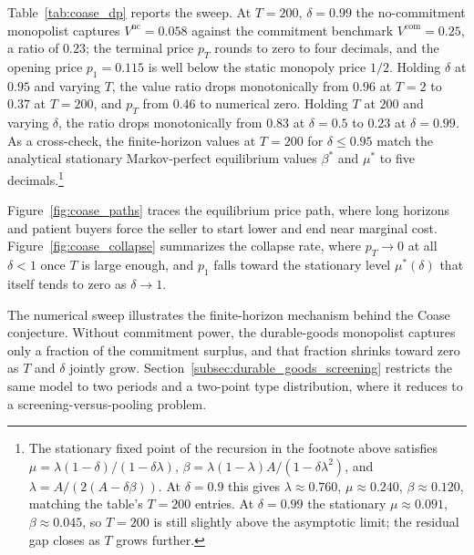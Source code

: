 \begin{table}[htbp]
\centering
\caption{Commitment value $V^{\mathrm{com}}$, no-commitment Markov-perfect value $V^{\mathrm{nc}}$, ratio $V^{\mathrm{nc}}/V^{\mathrm{com}}$, opening price $p_1$, and terminal price $p_T$ across the $(T, \delta)$ grid. Uniform valuations on $[0, 1]$, $c = 0$.}
\label{tab:coase_dp}

\end{table}

Table~\ref{tab:coase_dp} reports the sweep. At $T = 200$, $\delta = 0.99$ the no-commitment monopolist captures $V^{\mathrm{nc}} = 0.058$ against the commitment benchmark $V^{\mathrm{com}} = 0.25$, a ratio of $0.23$; the terminal price $p_T$ rounds to zero to four decimals, and the opening price $p_1 = 0.115$ is well below the static monopoly price $1/2$. Holding $\delta$ at $0.95$ and varying $T$, the value ratio drops monotonically from $0.96$ at $T = 2$ to $0.37$ at $T = 200$, and $p_T$ from $0.46$ to numerical zero. Holding $T$ at $200$ and varying $\delta$, the ratio drops monotonically from $0.83$ at $\delta = 0.5$ to $0.23$ at $\delta = 0.99$. As a cross-check, the finite-horizon values at $T = 200$ for $\delta \le 0.95$ match the analytical stationary Markov-perfect equilibrium values $\beta^*$ and $\mu^*$ to five decimals.\footnote{The stationary fixed point of the recursion in the footnote above satisfies $\mu = \lambda (1 - \delta) / (1 - \delta \lambda)$, $\beta = \lambda(1-\lambda) A / (1 - \delta \lambda^2)$, and $\lambda = A / (2 (A - \delta \beta))$. At $\delta = 0.9$ this gives $\lambda \approx 0.760$, $\mu \approx 0.240$, $\beta \approx 0.120$, matching the table's $T = 200$ entries. At $\delta = 0.99$ the stationary $\mu \approx 0.091$, $\beta \approx 0.045$, so $T = 200$ is still slightly above the asymptotic limit; the residual gap closes as $T$ grows further.}

Figure~\ref{fig:coase_paths} traces the equilibrium price path, where long horizons and patient buyers force the seller to start lower and end near marginal cost. Figure~\ref{fig:coase_collapse} summarizes the collapse rate, where $p_T \to 0$ at all $\delta < 1$ once $T$ is large enough, and $p_1$ falls toward the stationary level $\mu^*(\delta)$ that itself tends to zero as $\delta \to 1$.

The numerical sweep illustrates the finite-horizon mechanism behind the
Coase conjecture. Without commitment power, the durable-goods
monopolist captures only a fraction of the commitment surplus, and that
fraction shrinks toward zero as $T$ and $\delta$ jointly grow.
Section~\ref{subsec:durable_goods_screening} restricts the same model
to two periods and a two-point type distribution, where it reduces to
a screening-versus-pooling problem.

